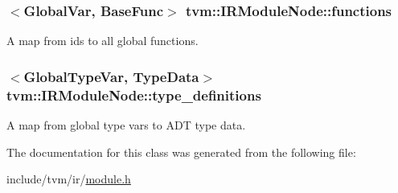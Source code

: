 \subsubsection[{\texorpdfstring{functions}{functions}}]{$<${\bf Global\+Var}, {\bf Base\+Func}$>$ tvm\+::\+I\+R\+Module\+Node\+::functions}\hypertarget{classtvm_1_1IRModuleNode_a88423026ad43fa60158bc9a647704d93}{}\label{classtvm_1_1IRModuleNode_a88423026ad43fa60158bc9a647704d93}


A map from ids to all global functions. 

\subsubsection[{\texorpdfstring{type\+\_\+definitions}{type_definitions}}]{$<${\bf Global\+Type\+Var}, {\bf Type\+Data}$>$ tvm\+::\+I\+R\+Module\+Node\+::type\+\_\+definitions}\hypertarget{classtvm_1_1IRModuleNode_a547dbf39f1ecf5324153e10f7ca724c3}{}\label{classtvm_1_1IRModuleNode_a547dbf39f1ecf5324153e10f7ca724c3}


A map from global type vars to A\+DT type data. 



The documentation for this class was generated from the following file\+:\begin{DoxyCompactItemize}
\item 
include/tvm/ir/\hyperlink{ir_2module_8h}{module.\+h}\end{DoxyCompactItemize}
